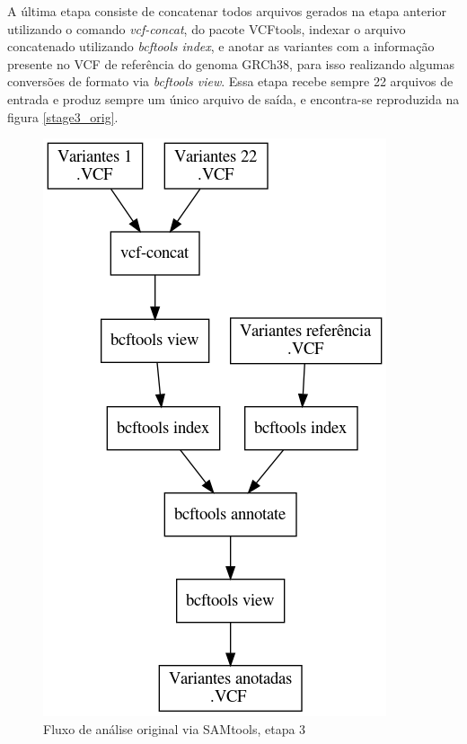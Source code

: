 \documentclass[cic,tc]{iiufrgs}
\begin{document}
A última etapa consiste de concatenar todos arquivos gerados na etapa anterior
utilizando o comando \textit{vcf-concat}, do pacote
VCFtools,\cite{10.1093/bioinformatics/btr330} indexar o arquivo concatenado
utilizando \textit{bcftools index}, e anotar as variantes com a informação
presente no VCF de referência do genoma GRCh38, para isso realizando algumas
conversões de formato via \textit{bcftools view}. Essa etapa recebe sempre 22
arquivos de entrada e produz sempre um único arquivo de saída, e encontra-se
reproduzida na figura \ref{stage3_orig}.

\begin{figure}
  \caption{Fluxo de análise original via SAMtools, etapa 3}
    \begin{center}
      \includegraphics[width=0.85\linewidth]{img/stage3_orig.png}
    \end{center}
    \label{fig:stage3_orig}
\end{figure}
\end{document}
